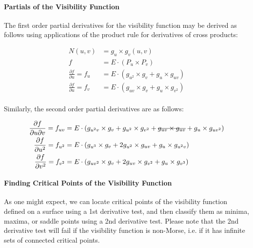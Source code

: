 \documentclass[12pt, letterpaper]{article}
\begin{document}
		\newpage
		\paragraph{Partials of the Visibility Function}

			The first order partial derivatives for the visibility function may be derived as follows using applications of the product rule for derivatives of cross products:

			\begin{align*}
			N(u, v) &= g_{u} \times g_{v} (u, v)\\
			f  &= E \cdot (P_{u} \times P_{v})\\
			\frac{\partial f}{\partial u} = f_{u} &= E \cdot (g_{u^{2}} \times g_{v} + g_{u} \times g_{uv})\\
			\frac{\partial f}{\partial u} = f_{v} &= E \cdot (g_{uv} \times g_{v} + g_{u} \times g_{v^{2}})\\
			\end{align*}

			Similarly, the second order partial derivatives are as follows:

			\begin{align*}
			\frac{\partial f}{\partial u \partial v} = f_{uv} &= E \cdot (g_{u^{2}v} \times g_{v} + g_{u^{2}} \times g_{v^{2}} + \text{\sout{\ensuremath{g_{uv} \times g_{uv}}}} + g_{u} \times g_{uv^{2}})\\
			\frac{\partial f}{\partial u^{2}} = f_{u^{2}}  &= E \cdot (g_{u^{3}} \times g_{v} + 2g_{u^{2}} \times g_{uv} + g_{u} \times g_{u^{2}v})\\
			\frac{\partial f}{\partial v^{2}} = f_{v^{2}}  &= E \cdot (g_{uv^{2}} \times g_{v} + 2g_{uv} \times g_{v^{2}} + g_{u} \times g_{v^{3}})\\
			\end{align*}

		\paragraph{Finding Critical Points of the Visibility Function}

		As one might expect, we can locate critical points of the visibility function defined on a surface using a 1st derivative test,
		and then classify them as minima, maxima, or saddle points using a 2nd derivative test. Please note that the 2nd derivative test will 
		fail if the visibility function is non-Morse, i.e. if it has infinite sets of connected critical points.
\end{document}
